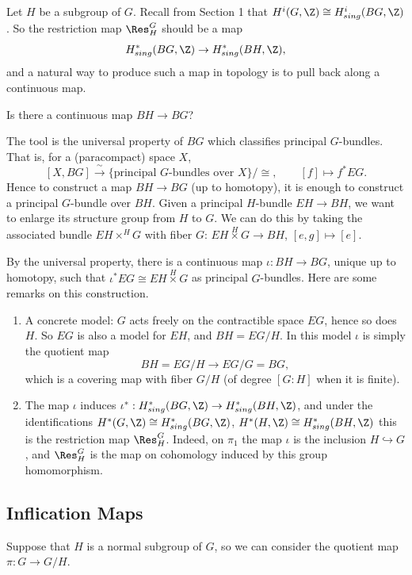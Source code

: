 \begin{example}
    
Let $H$ be a subgroup of $G$.
Recall from Section 1 that $H^i(G, \Z) \cong H^i_{sing}(BG, \Z)$.
So the restriction map $\Res_H^G$ should be a map
\[
    H^*_{sing}(BG, \Z) \to H^*_{sing}(BH, \Z),
\]
and a natural way to produce such a map in topology is to pull back along a continuous map.

\begin{question}
    Is there a continuous map $BH \to BG$?
\end{question}

The tool is the universal property of $BG$ which classifies principal $G$-bundles.
That is, for a (paracompact) space $X$,
\[
    [X, BG] \xrightarrow{\;\sim\;} \{\text{principal $G$-bundles over } X\}/\cong,
    \qquad [f] \mapsto f^*EG.
\]
Hence to construct a map $BH \to BG$ (up to homotopy),
it is enough to construct a principal $G$-bundle over $BH$.
Given a principal $H$-bundle $EH \to BH$, we want to enlarge its structure group from $H$ to $G$.
We can do this by taking the associated bundle $EH \times^H G$ with fiber $G$:
$EH \overset{H}{\times} G \to BH$, $[e, g] \mapsto [e]$.

By the universal property, there is a continuous map $\iota: BH \to BG$,
unique up to homotopy, such that $\iota^* EG \cong EH \overset{H}{\times} G$ as principal $G$-bundles.
Here are some remarks on this construction.
    \begin{enumerate}
        \item A concrete model: $G$ acts freely on the contractible space $EG$, hence so does $H$.
        So $EG$ is also a model for $EH$, and $BH = EG/H$.
        In this model $\iota$ is simply the quotient map
        \[
            BH = EG/H \longrightarrow EG/G = BG,
        \]
        which is a covering map with fiber $G/H$ (of degree $[G:H]$ when it is finite).
        \item The map $\iota$ induces $\iota^*: H^*_{sing}(BG, \Z) \to H^*_{sing}(BH, \Z)$,
        and under the identifications $H^*(G, \Z) \cong H^*_{sing}(BG, \Z)$, $H^*(H, \Z) \cong H^*_{sing}(BH, \Z)$
        this is the restriction map $\Res_H^G$.
        Indeed, on $\pi_1$ the map $\iota$ is the inclusion $H \hookrightarrow G$,
        and $\Res_H^G$ is the map on cohomology induced by this group homomorphism.
    \end{enumerate}
\end{example}

\subsection{Inflication Maps}
Suppose that $H$ is a normal subgroup of $G$,
so we can consider the quotient map $\pi: G \to G/H$.